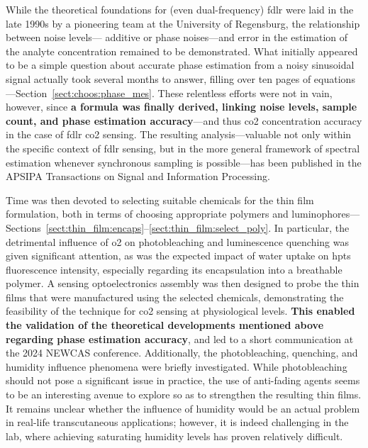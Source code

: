 While the theoretical foundations for (even dual-frequency) \gls{fdlr} were laid in the late 1990s by a pioneering team at the University of Regensburg\cite{neurauter2000_phd, klimant2001_pap}, the relationship between noise levels---\eg{} additive or phase noises---and error in the estimation of the analyte concentration remained to be demonstrated. What initially appeared to be a simple question about accurate phase estimation from a noisy sinusoidal signal actually took several months to answer, filling over ten pages of equations---Section~\ref{sect:choos:phase_mes}. These relentless efforts were not in vain, however, since \textbf{a formula was finally derived, linking noise levels, sample count, and phase estimation accuracy}---and thus \gls{co2} concentration accuracy in the case of \gls{fdlr} \gls{co2} sensing. The resulting analysis---valuable not only within the specific context of \gls{fdlr} sensing, but in the more general framework of spectral estimation whenever synchronous sampling is possible---has been published in the APSIPA Transactions on Signal and Information Processing\cite{dervieux2024phase}.

Time was then devoted to selecting suitable chemicals for the thin film formulation, both in terms of choosing appropriate polymers and luminophores---Sections~\ref{sect:thin_film:encaps}--\ref{sect:thin_film:select_poly}. In particular, the detrimental influence of \gls{o2} on photobleaching and luminescence quenching was given significant attention, as was the expected impact of water uptake on \gls{hpts} fluorescence intensity, especially regarding its encapsulation into a breathable polymer. A sensing optoelectronics assembly was then designed to probe the thin films that were manufactured using the selected chemicals, demonstrating the \invitro{} feasibility of the technique for \gls{co2} sensing at physiological levels. \textbf{This enabled the validation of the theoretical developments mentioned above regarding phase estimation accuracy}, and led to a short communication at the 2024 NEWCAS conference\cite{dervieux2024newcas}. Additionally, the photobleaching, quenching, and humidity influence phenomena were briefly investigated. While photobleaching should not pose a significant issue in practice, the use of anti-fading agents seems to be an interesting avenue to explore so as to strengthen the resulting thin films. It remains unclear whether the influence of humidity would be an actual problem in real-life transcutaneous applications; however, it is indeed challenging in the lab, where achieving saturating humidity levels has proven relatively difficult.

